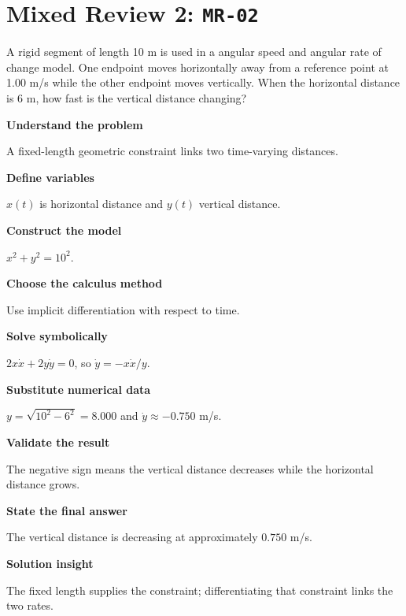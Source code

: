 \documentclass[11pt]{book}
\newcommand{\pid}[1]{\texttt{#1}}
\begin{document}
\section*{Mixed Review 2: \pid{MR-02}}
\begin{problembox}A rigid segment of length 10 m is used in a angular speed and angular rate of change model. One endpoint moves horizontally away from a reference point at 1.00 m/s while the other endpoint moves vertically. When the horizontal distance is 6 m, how fast is the vertical distance changing?\end{problembox}
\begin{solutionbox}
\textbf{Understand the problem}\par A fixed-length geometric constraint links two time-varying distances.\par\medskip
\textbf{Define variables}\par $x(t)$ is horizontal distance and $y(t)$ vertical distance.\par\medskip
\textbf{Construct the model}\par $x^2+y^2=10^2$.\par\medskip
\textbf{Choose the calculus method}\par Use implicit differentiation with respect to time.\par\medskip
\textbf{Solve symbolically}\par $2x\dot x+2y\dot y=0$, so $\dot y=-x\dot x/y$.\par\medskip
\textbf{Substitute numerical data}\par $y=\sqrt{10^2-6^2}=8.000$ and $\dot y\approx -0.750$ m/s.\par\medskip
\textbf{Validate the result}\par The negative sign means the vertical distance decreases while the horizontal distance grows.\par\medskip
\textbf{State the final answer}\par The vertical distance is decreasing at approximately $0.750$ m/s.\par\medskip
\textbf{Solution insight}\par The fixed length supplies the constraint; differentiating that constraint links the two rates.\par\medskip
\end{solutionbox}
\end{document}
